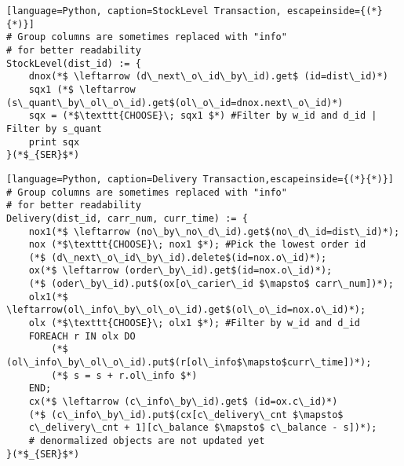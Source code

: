 \documentclass[12pt,letter]{article}
\begin{document}
\vspace{10mm}
\begin{lstlisting}[language=Python, caption=StockLevel Transaction, escapeinside={(*}{*)}]
# Group columns are sometimes replaced with "info" 
# for better readability 
StockLevel(dist_id) := {
	dnox(*$ \leftarrow (d\_next\_o\_id\_by\_id).get$ (id=dist\_id)*)
	sqx1 (*$ \leftarrow (s\_quant\_by\_ol\_o\_id).get$(ol\_o\_id=dnox.next\_o\_id)*)
	sqx = (*$\texttt{CHOOSE}\; sqx1 $*) #Filter by w_id and d_id | Filter by s_quant
	print sqx
}(*$_{SER}$*)
\end{lstlisting}

\newpage

\begin{lstlisting}[language=Python, caption=Delivery Transaction,escapeinside={(*}{*)}]
# Group columns are sometimes replaced with "info" 
# for better readability 
Delivery(dist_id, carr_num, curr_time) := {
	nox1(*$ \leftarrow (no\_by\_no\_d\_id).get$(no\_d\_id=dist\_id)*);
	nox (*$\texttt{CHOOSE}\; nox1 $*); #Pick the lowest order id
	(*$ (d\_next\_o\_id\_by\_id).delete$(id=nox.o\_id)*);
	ox(*$ \leftarrow (order\_by\_id).get$(id=nox.o\_id)*);
	(*$ (oder\_by\_id).put$(ox[o\_carier\_id $\mapsto$ carr\_num])*);
	olx1(*$ \leftarrow(ol\_info\_by\_ol\_o\_id).get$(ol\_o\_id=nox.o\_id)*);
	olx (*$\texttt{CHOOSE}\; olx1 $*); #Filter by w_id and d_id 
	FOREACH r IN olx DO
		(*$ (ol\_info\_by\_ol\_o\_id).put$(r[ol\_info$\mapsto$curr\_time])*);
		(*$ s = s + r.ol\_info $*)
	END;
	cx(*$ \leftarrow (c\_info\_by\_id).get$ (id=ox.c\_id)*)
	(*$ (c\_info\_by\_id).put$(cx[c\_delivery\_cnt $\mapsto$
	c\_delivery\_cnt + 1][c\_balance $\mapsto$ c\_balance - s])*);
	# denormalized objects are not updated yet
}(*$_{SER}$*)
\end{lstlisting}

\newpage





































\end{document}
